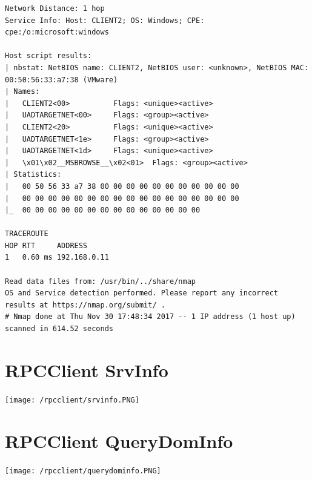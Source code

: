 \documentclass[12pt,a4paper]{article}
\begin{document}
\begin{appendices}
\begin{lstlisting}
Network Distance: 1 hop
Service Info: Host: CLIENT2; OS: Windows; CPE: cpe:/o:microsoft:windows

Host script results:
| nbstat: NetBIOS name: CLIENT2, NetBIOS user: <unknown>, NetBIOS MAC: 00:50:56:33:a7:38 (VMware)
| Names:
|   CLIENT2<00>          Flags: <unique><active>
|   UADTARGETNET<00>     Flags: <group><active>
|   CLIENT2<20>          Flags: <unique><active>
|   UADTARGETNET<1e>     Flags: <group><active>
|   UADTARGETNET<1d>     Flags: <unique><active>
|   \x01\x02__MSBROWSE__\x02<01>  Flags: <group><active>
| Statistics:
|   00 50 56 33 a7 38 00 00 00 00 00 00 00 00 00 00 00
|   00 00 00 00 00 00 00 00 00 00 00 00 00 00 00 00 00
|_  00 00 00 00 00 00 00 00 00 00 00 00 00 00

TRACEROUTE
HOP RTT     ADDRESS
1   0.60 ms 192.168.0.11

Read data files from: /usr/bin/../share/nmap
OS and Service detection performed. Please report any incorrect results at https://nmap.org/submit/ .
# Nmap done at Thu Nov 30 17:48:34 2017 -- 1 IP address (1 host up) scanned in 614.52 seconds
	\end{lstlisting}
	\section{RPCClient SrvInfo}
		\texttt{[image: /rpcclient/srvinfo.PNG]}
	\section{RPCClient QueryDomInfo}
		\texttt{[image: /rpcclient/querydominfo.PNG]}

\end{appendices}
\end{document}
